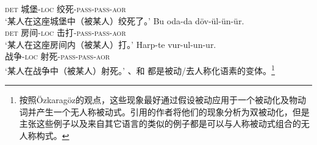      \textsc{det} 城堡-\textsc{loc} 绞死-\textsc{pass}-\textsc{pass}-\textsc{aor}\\
\glt `某人在这座城堡中（被某人）绞死了。'
\ex\label{ex-double-passivization-hit}
\gll Bu oda-da döv-ül-ün-ür.\\
     \textsc{det} 房间-\textsc{loc} 击打-\textsc{pass}-\textsc{pass}-\textsc{aor}\\
\glt `某人在这座房间内（被某人）打。'
\ex
\gll Harp-te vur-ul-un-ur.\\
     战争-\textsc{loc} 射死-\textsc{pass}-\textsc{pass}-\textsc{aor}\\
\glt `某人在战争中（被某人）射死。'
\zl
{}、和 都是被动/去人称化语素的变体。\footnote{按照Özkara\-göz的观点，这些现象最好通过假设被动应用于一个被动化及物动词并产生一个无人称被动式。引用的作者将他们的现象分析为双被动化，但是 \citet{Blevins2003a}主张这些例子以及来自其它语言的类似的例子都是可以与人称被动式组合的无人称构式。}

